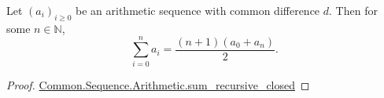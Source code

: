 \documentclass{article}
\begin{document}
\begin{theorem}

  Let $(a_i)_{i \geq 0}$ be an arithmetic sequence with common difference $d$.
  Then for some $n \in \mathbb{N}$,
  $$\sum_{i=0}^n a_i = \frac{(n + 1)(a_0 + a_n)}{2}.$$

\end{theorem}

\begin{proof}

  \href{Arithmetic.lean}{Common.Sequence.Arithmetic.sum_recursive_closed}

\end{proof}
\end{document}
